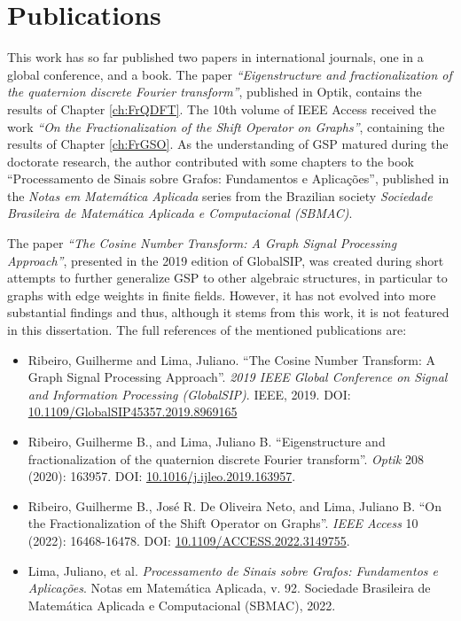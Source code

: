 \section{Publications}

This work has so far published two papers in international journals, one in a global conference, and a book. The paper \textit{``Eigenstructure and fractionalization of the quaternion discrete Fourier transform''}, published in Optik, contains the results of Chapter \ref{ch:FrQDFT}. The 10th volume of IEEE Access received the work \textit{``On the Fractionalization of the Shift Operator on Graphs''}, containing the results of Chapter \ref{ch:FrGSO}. As the understanding of GSP matured during the doctorate research, the author contributed with some chapters to the book ``Processamento de Sinais sobre Grafos: Fundamentos e Aplica{\c c}{\~o}es'', published in the \textit{Notas em Matem\'atica Aplicada} series from the Brazilian society \textit{Sociedade Brasileira de Matemática Aplicada e Computacional (SBMAC)}.

The paper \emph{``The Cosine Number Transform: A Graph Signal Processing Approach''}, presented in the 2019 edition of GlobalSIP, was created during short attempts to further generalize GSP to other algebraic structures, in particular to graphs with edge weights in finite fields. However, it has not evolved into more substantial findings and thus, although it stems from this work, it is not featured in this dissertation. The full references of the mentioned publications are:

\vspace{-1em}
\begin{itemize}[noitemsep]
    \item Ribeiro, Guilherme and Lima, Juliano. ``The Cosine Number Transform: A Graph Signal Processing Approach''. \textit{2019 IEEE Global Conference on Signal and Information Processing (GlobalSIP)}. IEEE, 2019. DOI: \href{https://doi.org/10.1109/GlobalSIP45357.2019.8969165}{10.1109/GlobalSIP45357.2019.8969165}

    \item Ribeiro, Guilherme B., and Lima, Juliano B. ``Eigenstructure and fractionalization of the quaternion discrete Fourier transform''. \textit{Optik} 208 (2020): 163957. DOI: \href{https://doi.org/10.1016/j.ijleo.2019.163957}{10.1016/\-j.ijleo.2019\-.163957}.

    \item Ribeiro, Guilherme B., José R. De Oliveira Neto, and Lima, Juliano B. ``On the Fractionalization of the Shift Operator on Graphs''. \textit{IEEE Access} 10 (2022): 16468-16478. DOI: \href{https://doi.org/10.1109/ACCESS.2022.3149755}{10.1109/ACCESS.2022.3149755}.

    \item Lima, Juliano, et al. \textit{Processamento de Sinais sobre Grafos: Fundamentos e Aplica{\c c}{\~o}es}. Notas em Matem\'atica Aplicada, v. 92. Sociedade Brasileira de Matemática Aplicada e Computacional (SBMAC), 2022.
\end{itemize}


